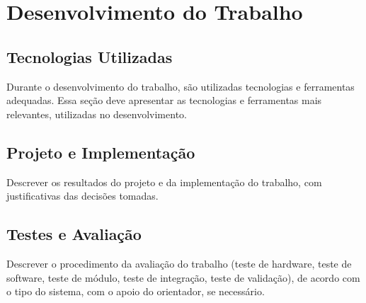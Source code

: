 \chapter{Desenvolvimento do Trabalho} \label{cap:desenvolvimento}

\section{Tecnologias Utilizadas}
Durante o desenvolvimento do trabalho, são utilizadas tecnologias e ferramentas adequadas. Essa seção deve apresentar as tecnologias e ferramentas mais relevantes, utilizadas no desenvolvimento. 

\section{Projeto e Implementação}
Descrever os resultados do projeto e da implementação do trabalho, com justificativas das decisões tomadas.

\section{Testes e Avaliação}
Descrever o procedimento da avaliação do trabalho (teste de hardware, teste de software, teste de módulo, teste de integração, teste de validação), de acordo com o tipo do sistema, com o apoio do orientador, se necessário.